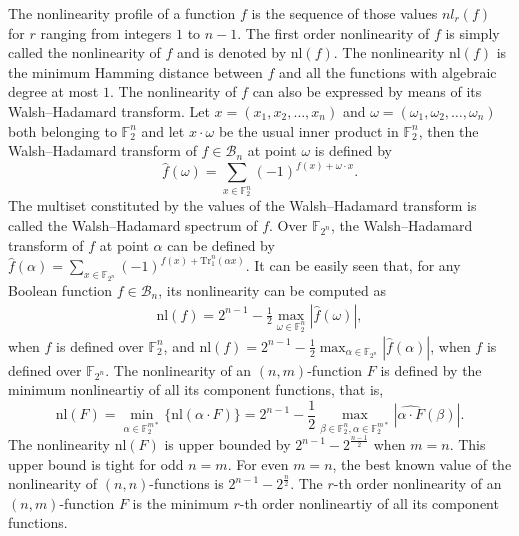 \documentclass[12 pt]{article}
\def\F{{\mathbb F}}
\begin{document}
The nonlinearity profile of a function $f$ is the sequence of those values $nl_r(f)$ for $r$ ranging from integers $1$ to $n-1$. The first order nonlinearity of $f$ is simply called the
nonlinearity of $f$ and is denoted by $\mathrm{nl}(f)$. The nonlinearity $\mathrm{nl}(f)$ is the minimum Hamming distance between $f$ and all the functions with algebraic degree at most $1$.
The nonlinearity of $f$ can also be expressed by means of its Walsh--Hadamard transform. Let $x=(x_1, x_2, \ldots , x_n)$ and $\omega=(\omega_1, \omega_2, \ldots , \omega_n)$ both
belonging to $\F_2^n$ and let $x\cdot\omega$ be the usual inner product in $\F_2^n$, then the Walsh--Hadamard transform of $f\in\mathcal{B}_n$ at point $\omega$ is defined by
\begin{equation*}
\widehat{f}(\omega)=\sum_{x\in\F_2^n}(-1)^{f(x)+\omega\cdot x}.
\end{equation*}
The multiset constituted by the values of the Walsh--Hadamard transform is called the Walsh--Hadamard spectrum of $f$. Over $\F_{2^n}$, the Walsh--Hadamard transform of $f$ at
point $\alpha$ can be defined by
$\widehat{f}(\alpha)=\sum_{x\in\mathbb F_{2^n}}(-1)^{f(x)+\mathrm{Tr}_1^n(\alpha x)}$. It can be easily seen that, for any Boolean function $f\in\mathcal{B}_n$,
its nonlinearity can be computed as
\begin{eqnarray}\label{N_f}
\mathrm{nl}(f)= 2^{n-1}-\frac{1}{2}\max_{\omega\in\F_2^n}|\widehat{f}(\omega)|,
\end{eqnarray}
when $f$ is defined over $\F_2^n$, and
$\mathrm{nl}(f)= 2^{n-1}-\frac{1}{2}\max_{\alpha\in\F_{2^n}}|\widehat{f}(\alpha)|$,
when $f$ is defined over $\F_{2^n}$. The nonlinearity of an $(n,m)$-function $F$ is defined by the minimum nonlineartiy of all its component functions, that is,
\begin{equation*}
\mathrm{nl}(F)=\min_{\alpha\in\mathbb F_2^{m*}}\{\mathrm{nl}(\alpha\cdot F)\}=2^{n-1}-\frac{1}{2}\max_{\beta\in\mathbb F_2^n, \alpha\in\mathbb F_2^{m*}} |\widehat{\alpha\cdot F}(\beta)|.
\end{equation*}
The nonlinearity $\mathrm{nl}(F)$ is upper bounded by $2^{n-1}-2^{\frac{n-1}{2}}$ when $m=n$. This upper bound is tight for odd $n=m$. For even $m=n$, the best known value of the
nonlinearity of $(n,n)$-functions is $2^{n-1}-2^{\frac n2}$. The $r$-th order nonlinearity of an $(n,m)$-function $F$ is the minimum $r$-th order nonlineartiy of all its component functions.
\end{document}
